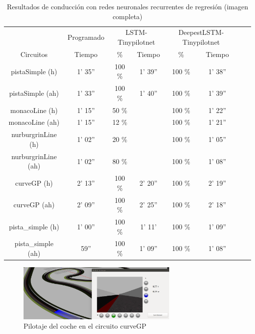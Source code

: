 \begin{table}[H]
\centering
\caption{Resultados de conducción con redes neuronales recurrentes de regresión (imagen completa)}
\label{resultados_regresion_recurrente_completa}
\begin{tabular}{c|c|c|c|c|c|c|c|}
\cline{2-6}
                          & \multicolumn{1}{c|}{Programado} & \multicolumn{2}{c|}{LSTM-Tinypilotnet} & \multicolumn{2}{c|}{DeepestLSTM-Tinypilotnet} \\ \cline{1-6} 
                        \multicolumn{1}{|c|}{Circuitos}    & Tiempo       & \%       & Tiempo       & \%        & Tiempo      \\ \hline
\multicolumn{1}{|c|}{pistaSimple (h)}    & 1' 35''     & 100 \%  & 1' 39''    & 100 \%  & 1' 38''         \\ \hline
\multicolumn{1}{|c|}{pistaSimple (ah)}     & 1' 33''   & 100 \%        & 1' 40''        & 100 \%     & 1' 39''   \\ \hline
\multicolumn{1}{|c|}{monacoLine (h)}      & 1' 15''      & 50 \%        &        & 100 \%       & 1' 22''           \\ \hline
\multicolumn{1}{|c|}{monacoLine (ah)}       & 1' 15''       & 12 \%       &         & 100 \%          & 1' 21''        \\ \hline
\multicolumn{1}{|c|}{nurburgrinLine (h)}      & 1' 02''       & 20 \%     &       & 100 \%     & 1' 05''       \\ \hline
\multicolumn{1}{|c|}{nurburgrinLine (ah)}       & 1' 02''     & 80 \%     &        & 100 \%     & 1' 08''         \\ \hline
\multicolumn{1}{|c|}{curveGP (h)}     & 2' 13''     & 100 \%     & 2' 20''     & 100 \%      & 2' 19''             \\ \hline
\multicolumn{1}{|c|}{curveGP (ah)}       & 2' 09''       & 100 \%    & 2' 25''     & 100 \%       & 2' 18''      \\ \hline
\multicolumn{1}{|c|}{pista\_simple (h)}       & 1' 00''    & 100 \%      & 1' 11'      & 100 \%      & 1' 09''    \\ \hline
\multicolumn{1}{|c|}{pista\_simple (ah)}     & 59''    & 100 \%    & 1' 09''    &  100 \%      & 1' 08''          \\ \hline
\end{tabular}
\end{table}


\begin{figure}[H]
\begin{center}
	\includegraphics[width=0.7\textwidth]{figures/Regresion/deep_curve.png}
   \caption{Pilotaje del coche en el circuito curveGP}
	\label{fig.curve_reg}
\end{center}
\end{figure}

